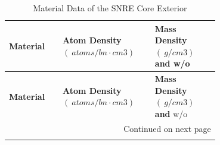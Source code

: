 \documentclass[8pt,a5paper]{article}
\begin{document}
\begin{longtable}{|m{0.2\linewidth}|m{0.25\linewidth}|m{0.25\linewidth}|}
    \caption{Material Data of the SNRE Core Exterior} \\
    
    \hline \textbf{Material} & \textbf{Atom Density $(\SI{}{atoms/bn \cdot cm3})$} & \textbf{Mass Density $(\SI{}{g/cm3})$ and} w/o \\ \hline 
    \endfirsthead
    
    
    \hline \textbf{Material} & \textbf{Atom Density $(\SI{}{atoms/bn \cdot cm3})$} & \textbf{Mass Density $(\SI{}{g/cm3})$ and} w/o \\ \hline 
    \endhead
    
    \hline \multicolumn{3}{|r|}{{Continued on next page}} \\ \hline
    \endfoot
    

\end{longtable}
\end{document}
